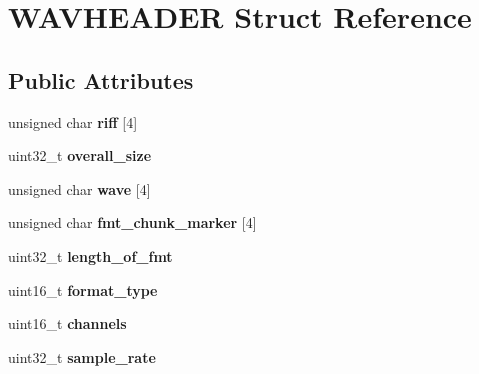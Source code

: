 \hypertarget{struct_w_a_v_h_e_a_d_e_r}{}\section{W\+A\+V\+H\+E\+A\+D\+ER Struct Reference}
\label{struct_w_a_v_h_e_a_d_e_r}
\subsection*{Public Attributes}
\begin{DoxyCompactItemize}
\item 
\mbox{\label{struct_w_a_v_h_e_a_d_e_r_a5a14600e998a7fa28053a93ab69c59dc}} 
unsigned char {\bfseries riff} \mbox{[}4\mbox{]}
\item 
\mbox{\label{struct_w_a_v_h_e_a_d_e_r_aa32738f840f2e1f11fbb3d6934e3cee1}} 
uint32\+\_\+t {\bfseries overall\+\_\+size}
\item 
\mbox{\label{struct_w_a_v_h_e_a_d_e_r_a847be343b633c0ccaea5c0637431f56d}} 
unsigned char {\bfseries wave} \mbox{[}4\mbox{]}
\item 
\mbox{\label{struct_w_a_v_h_e_a_d_e_r_a69fff31085a4de24601ae5d45d70adc6}} 
unsigned char {\bfseries fmt\+\_\+chunk\+\_\+marker} \mbox{[}4\mbox{]}
\item 
\mbox{\label{struct_w_a_v_h_e_a_d_e_r_ab504bcdcab131e8fce33301bcd992746}} 
uint32\+\_\+t {\bfseries length\+\_\+of\+\_\+fmt}
\item 
\mbox{\label{struct_w_a_v_h_e_a_d_e_r_a73aa611a5cbe6339ffb26a697f6c13e2}} 
uint16\+\_\+t {\bfseries format\+\_\+type}
\item 
\mbox{\label{struct_w_a_v_h_e_a_d_e_r_a5cd1397103e8325b454a096624b4ac9e}} 
uint16\+\_\+t {\bfseries channels}
\item 
\mbox{\label{struct_w_a_v_h_e_a_d_e_r_abaa0dc07cc2af766269066d222775c8b}} 
uint32\+\_\+t {\bfseries sample\+\_\+rate}
\item 
\mbox{\label{struct_w_a_v_h_e_a_d_e_r_aed048489e477e45c176d30fa9dff69da}} 

\end{DoxyCompactItemize}
